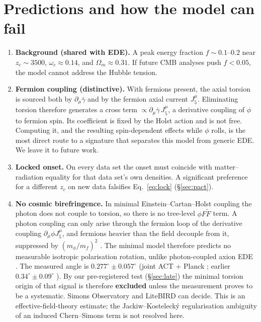 \documentclass[11pt]{article}
\begin{document}
\section{Predictions and how the model can fail}\label{sec:predictions}
\begin{enumerate}
\item \textbf{Background (shared with EDE).} A peak energy fraction $f\sim0.1$--$0.2$
near $z_c\sim3500$, $\omega_c\approx0.14$, and $\Omega_m\approx0.31$. If future CMB
analyses push $f<0.05$, the model cannot address the Hubble tension.
\item \textbf{Fermion coupling (distinctive).} With fermions present, the axial torsion
is sourced both by $\partial_\mu\bar\gamma$ and by the fermion axial current
$J_5^\mu$. Eliminating torsion therefore generates a cross term
$\propto\partial_\mu\bar\gamma\,J_5^\mu$, a derivative coupling of $\phi$ to fermion
spin. Its coefficient is fixed by the Holst action and is not free. Computing it, and the
resulting spin-dependent effects while $\phi$ rolls, is the most direct route to a
signature that separates this model from generic EDE. We leave it to future work.
\item \textbf{Locked onset.} On every data set the onset must coincide with
matter--radiation equality for that data set's own densities. A significant preference for a
different $z_c$ on new data falsifies Eq.~\eqref{eq:lock} (\S\ref{sec:pact}).
\item \textbf{No cosmic birefringence.} In minimal Einstein--Cartan--Holst coupling the
photon does not couple to torsion, so there is no tree-level $\phi F\tilde F$ term. A
photon coupling can only arise through the fermion loop of the derivative coupling
$\partial_\mu\phi J_5^\mu$, and fermions heavier than the field decouple from it, suppressed by
$(m_\phi/m_f)^2$ \cite{bauer2017,quevillon2019}. The minimal model therefore predicts no
measurable isotropic polarisation rotation, unlike photon-coupled axion EDE
\cite{carroll1998,murai2023}. The measured angle is $0.277^\circ\pm0.057^\circ$ (joint ACT + Planck
\cite{eskilt2026}; earlier $0.34^\circ\pm0.09^\circ$ \cite{minami2020,eskilt2022}). By our pre-registered
test (\S\ref{sec:late}) the minimal torsion origin of that signal is therefore \textbf{excluded} unless the
measurement proves to be a systematic. Simons Observatory \cite{so2019} and LiteBIRD \cite{litebird2023} can
decide. This is an effective-field-theory estimate; the Jackiw--Kosteleck\'y regularisation ambiguity of an
induced Chern--Simons term is not resolved here.

\end{enumerate}
\end{document}
